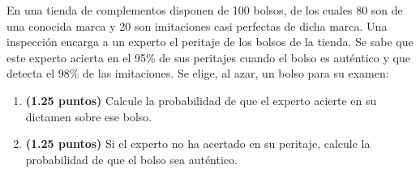 
En una tienda de complementos disponen de 100 bolsos, de los cuales 80 son de una conocida marca y 20 son imitaciones casi perfectas de dicha marca. Una inspección encarga a un experto el peritaje de los bolsos de la tienda. Se sabe que este experto acierta en el 95\% de sus peritajes cuando el bolso es auténtico y que detecta el 98\% de las imitaciones. Se elige, al azar, un bolso para su examen:
\begin{enumerate}[label=\alph*)]
\item \textbf{(1.25 puntos)} Calcule la probabilidad de que el experto acierte en su dictamen sobre ese bolso.
\item \textbf{(1.25 puntos)} Si el experto no ha acertado en su peritaje, calcule la probabilidad de que el bolso sea auténtico.
\end{enumerate}
